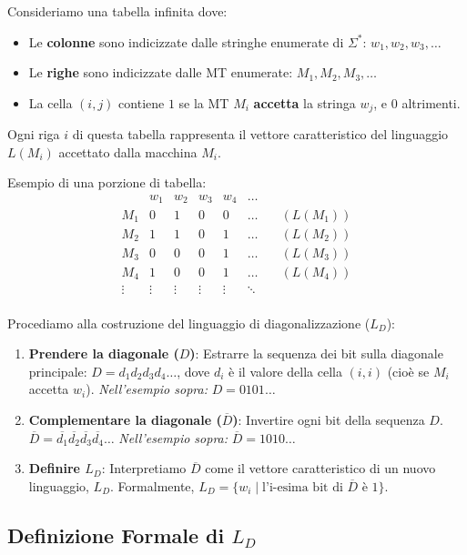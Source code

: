 \documentclass[a4paper, 11pt]{book} %
\theoremstyle{definition}
\begin{document}
Consideriamo una tabella infinita dove:
\begin{itemize}
    \item Le \textbf{colonne} sono indicizzate dalle stringhe enumerate di $\Sigma^*$: $w_1, w_2, w_3, \dots$
    \item Le \textbf{righe} sono indicizzate dalle MT enumerate: $M_1, M_2, M_3, \dots$
    \item La cella $(i, j)$ contiene $1$ se la MT $M_i$ \textbf{accetta} la stringa $w_j$, e $0$ altrimenti.
\end{itemize}
Ogni riga $i$ di questa tabella rappresenta il vettore caratteristico del linguaggio $L(M_i)$ accettato dalla macchina $M_i$.

Esempio di una porzione di tabella:
\[
\begin{array}{c|cccccc}
        & w_1 & w_2 & w_3 & w_4 & \dots \\
    \hline
    M_1 & 0 & 1 & 0 & 0 & \dots & \quad (L(M_1)) \\
    M_2 & 1 & 1 & 0 & 1 & \dots & \quad (L(M_2)) \\
    M_3 & 0 & 0 & 0 & 1 & \dots & \quad (L(M_3)) \\
    M_4 & 1 & 0 & 0 & 1 & \dots & \quad (L(M_4)) \\
    \vdots & \vdots & \vdots & \vdots & \vdots & \ddots \\
\end{array}
\]

Procediamo alla costruzione del linguaggio di diagonalizzazione ($L_D$):
\begin{enumerate}
    \item \textbf{Prendere la diagonale ($D$)}: Estrarre la sequenza dei bit sulla diagonale principale: $D = d_1 d_2 d_3 d_4 \dots$, dove $d_i$ è il valore della cella $(i,i)$ (cioè se $M_i$ accetta $w_i$).
    \textit{Nell'esempio sopra:} $D = 0101\dots$
    \item \textbf{Complementare la diagonale ($\overline{D}$)}: Invertire ogni bit della sequenza $D$.
    $\overline{D} = \overline{d_1} \overline{d_2} \overline{d_3} \overline{d_4} \dots$
    \textit{Nell'esempio sopra:} $\overline{D} = 1010\dots$
    \item \textbf{Definire $L_D$}: Interpretiamo $\overline{D}$ come il vettore caratteristico di un nuovo linguaggio, $L_D$.
    Formalmente, $L_D = \{ w_i \mid \text{l'i-esima bit di } \overline{D} \text{ è } 1 \}$.
\end{enumerate}

\subsection{Definizione Formale di $L_D$}
\end{document}
